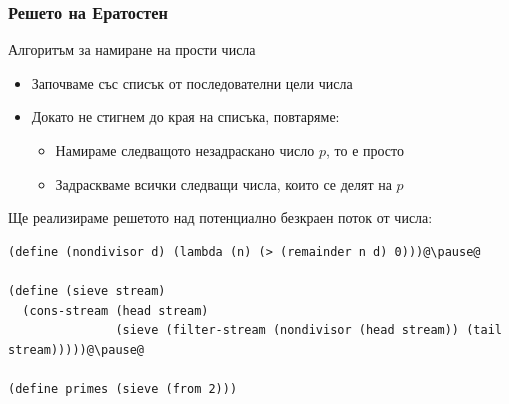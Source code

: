 \documentclass[alsotrans,beameroptions={aspectratio=169}]{beamerswitch}
\begin{document}
\begin{frame}[fragile]
  \frametitle{Решето на Ератостен}

  \pause
  Алгоритъм за намиране на прости числа
  \pause
  \begin{itemize}
  \item Започваме със списък от последователни цели числа
  \item Докато не стигнем до края на списъка, повтаряме:
    \begin{itemize}
    \item Намираме следващото незадраскано число $p$, то е просто
    \item Задраскваме всички следващи числа, които се делят на $p$
    \end{itemize}
  \end{itemize}
  \pause
  Ще реализираме решетото над потенциално безкраен поток от числа:
  \pause
\begin{lstlisting}
(define (nondivisor d) (lambda (n) (> (remainder n d) 0)))@\pause@

(define (sieve stream)
  (cons-stream (head stream)
               (sieve (filter-stream (nondivisor (head stream)) (tail stream)))))@\pause@

(define primes (sieve (from 2)))
\end{lstlisting}
\end{frame}
\end{document}
